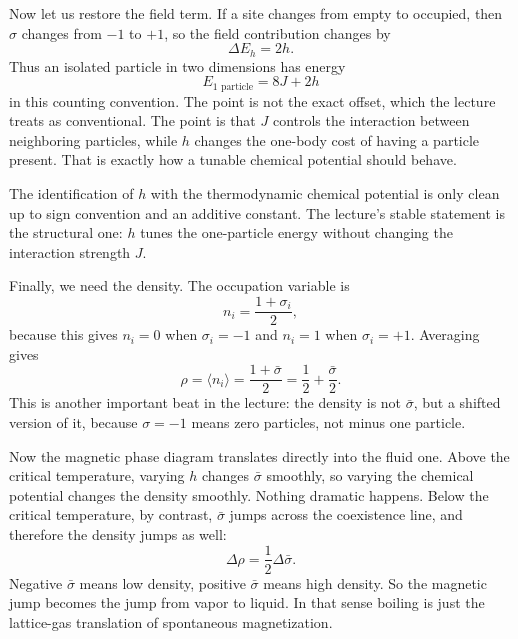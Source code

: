 Now let us restore the field term. If a site changes from empty to occupied, then \(\sigma\) changes from \(-1\) to \(+1\), so the field contribution changes by
\begin{equation}
\Delta E_h = 2h.
\end{equation}
Thus an isolated particle in two dimensions has energy
\begin{equation}
E_{1\text{ particle}}=8J+2h
\end{equation}
in this counting convention. The point is not the exact offset, which the lecture treats as conventional. The point is that \(J\) controls the interaction between neighboring particles, while \(h\) changes the one-body cost of having a particle present. That is exactly how a tunable chemical potential should behave.

\begin{remark}
The identification of \(h\) with the thermodynamic chemical potential is only clean up to sign convention and an additive constant. The lecture's stable statement is the structural one: \(h\) tunes the one-particle energy without changing the interaction strength \(J\).
\end{remark}

Finally, we need the density. The occupation variable is
\begin{equation}
n_i=\frac{1+\sigma_i}{2},
\end{equation}
because this gives \(n_i=0\) when \(\sigma_i=-1\) and \(n_i=1\) when \(\sigma_i=+1\). Averaging gives
\begin{equation}
\rho=\langle n_i\rangle=\frac{1+\bar{\sigma}}{2}
=\frac12+\frac{\bar{\sigma}}{2}.
\end{equation}
This is another important beat in the lecture: the density is not \(\bar{\sigma}\), but a shifted version of it, because \(\sigma=-1\) means zero particles, not minus one particle.

Now the magnetic phase diagram translates directly into the fluid one. Above the critical temperature, varying \(h\) changes \(\bar{\sigma}\) smoothly, so varying the chemical potential changes the density smoothly. Nothing dramatic happens. Below the critical temperature, by contrast, \(\bar{\sigma}\) jumps across the coexistence line, and therefore the density jumps as well:
\begin{equation}
\Delta \rho = \frac12 \Delta \bar{\sigma}.
\end{equation}
Negative \(\bar{\sigma}\) means low density, positive \(\bar{\sigma}\) means high density. So the magnetic jump becomes the jump from vapor to liquid. In that sense boiling is just the lattice-gas translation of spontaneous magnetization.

